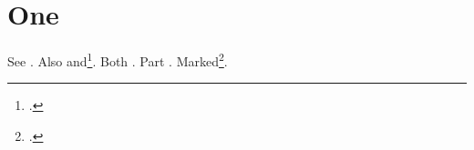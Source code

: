 \documentclass{article}
\begin{document}
\tableofcontents
\section{One}
See . Also and\footcite{just22}.
Both . Part . Marked\footnotemark\footcitetext{doe20}.
\end{document}
